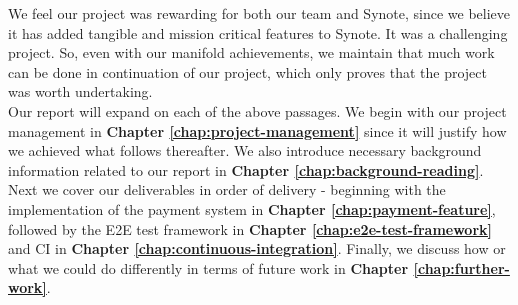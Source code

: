 We feel our project was rewarding for both our team and Synote, since we believe it has added tangible and mission critical features to Synote. It was a challenging project. So, even with our manifold achievements, we maintain that much work can be done in continuation of our project, which only proves that the project was worth undertaking.\\

Our report will expand on each of the above passages. We begin with our project management in \textbf{Chapter \ref{chap:project-management}} since it will justify how we achieved what follows thereafter. We also introduce necessary background information related to our report in \textbf{Chapter \ref{chap:background-reading}}. Next we cover our deliverables in order of delivery - beginning with the implementation of the payment system in \textbf{Chapter \ref{chap:payment-feature}}, followed by the E2E test framework in \textbf{Chapter \ref{chap:e2e-test-framework}} and CI in \textbf{Chapter \ref{chap:continuous-integration}}. Finally, we discuss how or what we could do differently in terms of future work in \textbf{Chapter \ref{chap:further-work}}.
